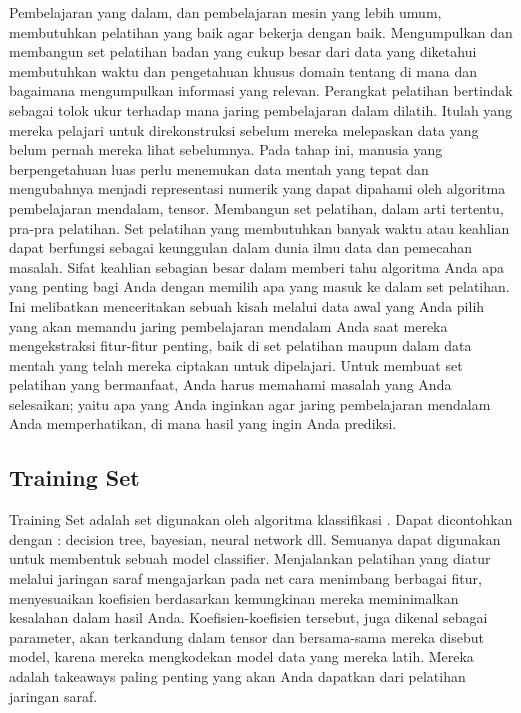 Pembelajaran yang dalam, dan pembelajaran mesin yang lebih umum, membutuhkan pelatihan yang baik agar bekerja dengan baik. Mengumpulkan dan membangun set pelatihan  badan yang cukup besar dari data yang diketahui  membutuhkan waktu dan pengetahuan khusus domain tentang di mana dan bagaimana mengumpulkan informasi yang relevan. Perangkat pelatihan bertindak sebagai tolok ukur terhadap mana jaring pembelajaran dalam dilatih. Itulah yang mereka pelajari untuk direkonstruksi sebelum mereka melepaskan data yang belum pernah mereka lihat sebelumnya. Pada tahap ini, manusia yang berpengetahuan luas perlu menemukan data mentah yang tepat dan mengubahnya menjadi representasi numerik yang dapat dipahami oleh algoritma pembelajaran mendalam, tensor. Membangun set pelatihan, dalam arti tertentu, pra-pra pelatihan. Set pelatihan yang membutuhkan banyak waktu atau keahlian dapat berfungsi sebagai keunggulan dalam dunia ilmu data dan pemecahan masalah. Sifat keahlian sebagian besar dalam memberi tahu algoritma Anda apa yang penting bagi Anda dengan memilih apa yang masuk ke dalam set pelatihan. Ini melibatkan menceritakan sebuah kisah  melalui data awal yang Anda pilih yang akan memandu jaring pembelajaran mendalam Anda saat mereka mengekstraksi fitur-fitur penting, baik di set pelatihan maupun dalam data mentah yang telah mereka ciptakan untuk dipelajari. Untuk membuat set pelatihan yang bermanfaat, Anda harus memahami masalah yang Anda selesaikan; yaitu apa yang Anda inginkan agar jaring pembelajaran mendalam Anda memperhatikan, di mana hasil yang ingin Anda prediksi.

\subsection{Training Set}
Training Set adalah set digunakan oleh algoritma klassifikasi . Dapat dicontohkan dengan : decision tree, bayesian, neural network dll. Semuanya dapat digunakan untuk membentuk sebuah model classifier. Menjalankan pelatihan yang diatur melalui jaringan saraf mengajarkan pada net
cara menimbang berbagai fitur, menyesuaikan koefisien berdasarkan kemungkinan mereka meminimalkan kesalahan dalam hasil Anda. Koefisien-koefisien tersebut, juga dikenal sebagai parameter, akan terkandung dalam tensor dan bersama-sama mereka disebut model, karena mereka mengkodekan model data yang mereka latih. Mereka adalah takeaways paling penting yang akan Anda dapatkan dari pelatihan jaringan saraf.

